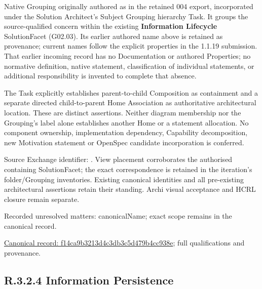 Native Grouping originally authored as \texttt{} in the retained 004 export,
incorporated under the Solution Architect's Subject Grouping hierarchy Task.
It groups the source-qualified \texttt{} concern within
the existing \textbf{Information Lifecycle} SolutionFacet (G02.03). Its earlier authored name above is retained as provenance; current names
follow the explicit properties in the 1.1.19 submission.
That earlier incoming record has no Documentation or authored Properties; no normative
definition, native statement, classification of individual statements, or
additional responsibility is invented to complete that absence.



The Task explicitly establishes parent-to-child Composition as containment and
a separate directed child-to-parent Home Association as authoritative architectural
location. These are distinct assertions. Neither diagram membership nor the
Grouping's label alone establishes another Home or a statement allocation.
No component ownership, implementation dependency, Capability decomposition,
new Motivation statement or OpenSpec candidate incorporation is conferred.



Source Exchange identifier: \texttt{}. View placement corroborates
the authorised containing SolutionFacet; the exact correspondence is retained in the
iteration's folder/Grouping inventories. Existing canonical identities and all
pre-existing architectural assertions retain their standing. Archi visual
acceptance and HCRL closure remain separate.


{\small Recorded unresolved matters: canonicalName; exact scope remains in the canonical record.}\par
{\footnotesize \href{../../../../../../../continuum/grouping/f14ca9b3213d4c3db3c5d479b4cc938e.md}{Canonical record: f14ca9b3213d4c3db3c5d479b4cc938e}; full qualifications and provenance.}\par
\subsection*{R.3.2.4 Information Persistence}
\label{navigation:R.3.2.4}

